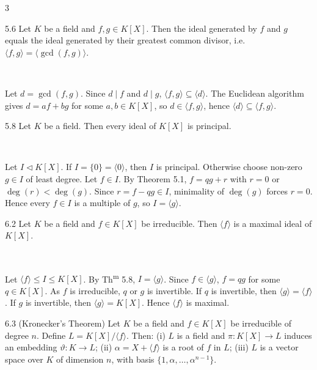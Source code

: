 \documentclass[8pt]{extarticle}
\makeatletter
\renewenvironment{proof}[1][\proofname]{%
  \begin{tcolorbox}[proofpairboxstyle]%
  \pushQED{\qed}%
  \normalfont\itshape #1\@addpunct{.}\ \normalfont\ignorespaces
}{%
  \popQED%
  \end{tcolorbox}%
}
\makeatother
\begin{document}
\begin{multicols*}{3}
        \begin{corollary}{5.6}
            Let \(K\) be a field and \(f,g\in K[X]\). Then the ideal generated by \(f\) and \(g\) equals the ideal generated by their greatest common divisor, i.e. \(\langle f,g\rangle=\langle\gcd(f,g)\rangle\).
        \end{corollary}

        \begin{proof}
            Let \(d=\gcd(f,g)\). Since \(d\mid f\) and \(d\mid g\), \(\langle f,g\rangle\subseteq\langle d\rangle\). The Euclidean algorithm gives \(d=af+bg\) for some \(a,b\in K[X]\), so \(d\in\langle f,g\rangle\), hence \(\langle d\rangle\subseteq\langle f,g\rangle\).
        \end{proof}

        \begin{theorem}{5.8}
            Let \(K\) be a field. Then every ideal of \(K[X]\) is principal.
        \end{theorem}

        \begin{proof}
            Let \(I\lhd K[X]\). If \(I=\{0\}=\langle0\rangle\), then \(I\) is principal. Otherwise choose non-zero \(g\in I\) of least degree. Let \(f\in I\). By Theorem 5.1, \(f=qg+r\) with \(r=0\) or \(\deg(r)<\deg(g)\). Since \(r=f-qg\in I\), minimality of \(\deg(g)\) forces \(r=0\). Hence every \(f\in I\) is a multiple of \(g\), so \(I=\langle g\rangle\).
        \end{proof}

        \begin{lemma}{6.2}
            Let \(K\) be a field and \(f\in K[X]\) be irreducible. Then \(\langle f\rangle\) is a maximal ideal of \(K[X]\).
        \end{lemma}

        \begin{proof}
            Let \(\langle f\rangle\le I\le K[X]\). By Th\textsuperscript{m} 5.8, \(I=\langle g\rangle\). Since \(f\in\langle g\rangle\), \(f=qg\) for some \(q\in K[X]\). As \(f\) is irreducible, \(q\) or \(g\) is invertible. If \(q\) is invertible, then \(\langle g\rangle=\langle f\rangle\). If \(g\) is invertible, then \(\langle g\rangle=K[X]\). Hence \(\langle f\rangle\) is maximal.
        \end{proof}

        \begin{theorem}{6.3}
            (Kronecker's Theorem) Let \(K\) be a field and \(f\in K[X]\) be irreducible of degree \(n\). Define \(L=K[X]/\langle f\rangle\). Then: (i) \(L\) is a field and \(\pi:K[X]\to L\) induces an embedding \(\vartheta:K\to L\); (ii) \(\alpha=X+\langle f\rangle\) is a root of \(f\) in \(L\); (iii) \(L\) is a vector space over \(K\) of dimension \(n\), with basis \(\{1,\alpha,\ldots,\alpha^{n-1}\}\).
        \end{theorem}


\end{multicols*}
\end{document}
